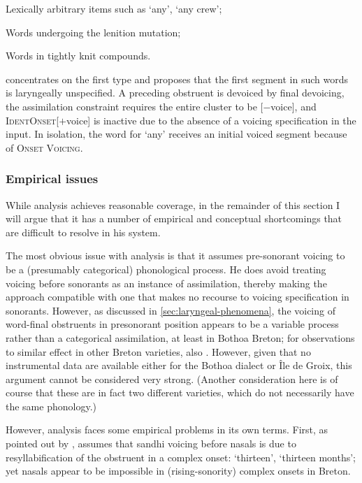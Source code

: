 \begin{itemize*}
\item Lexically arbitrary items such as \ipa{[bəˈnak]} `any',  `any crew';
\item Words undergoing the lenition mutation;
\item Words in tightly knit compounds.
\end{itemize*}

\citet{kramer-breton} concentrates on the first type and proposes that the first segment in such words is laryngeally unspecified. A preceding obstruent is devoiced by final devoicing, the assimilation constraint requires the entire cluster to be [$-$voice], and \textsc{IdentOnset}[$+$voice] is inactive due to the absence of a voicing specification in the input. In isolation, the word for `any' receives an initial voiced segment because of \textsc{Onset Voicing}.

\subsubsection{Empirical issues}
\label{sec:empirical-issues}

While  analysis achieves reasonable coverage, in the remainder of this section I will argue that it has a number of empirical and conceptual shortcomings that are difficult to resolve in his system.

The most obvious issue with  analysis is that it assumes pre\hyp sonorant voicing to be a (presumably categorical) phonological process. He does avoid treating voicing before sonorants as an instance of assimilation, thereby making the approach compatible with one that makes no recourse to voicing specification in sonorants. However, as discussed in \cref{sec:laryngeal-phenomena}, the voicing of word\hyp final obstruents in presonorant position appears to be a variable process rather than a categorical assimilation, at least in Bothoa Breton; for observations to similar effect in other Breton varieties, \cf also \citet{plougrescant,timm84:_carhais_breton,mckenna,wmffre99:_centr_breton}. However, given that no instrumental data are available either for the Bothoa dialect or Île de Groix, this argument cannot be considered very strong. (Another consideration here is of course that these are in fact two different varieties, which do not necessarily have the same phonology.)

However,  analysis faces some empirical problems in its own terms. First, as pointed out by \citet{hall09:_laryn_breton}, \citeauthor{kramer-breton} assumes that sandhi voicing before nasals is due to resyllabification of the obstruent in a complex onset: \ipa{[triˈzek]} `thirteen',  `thirteen months'; yet nasals appear to be impossible in (rising\hyp sonority) complex onsets in Breton.

